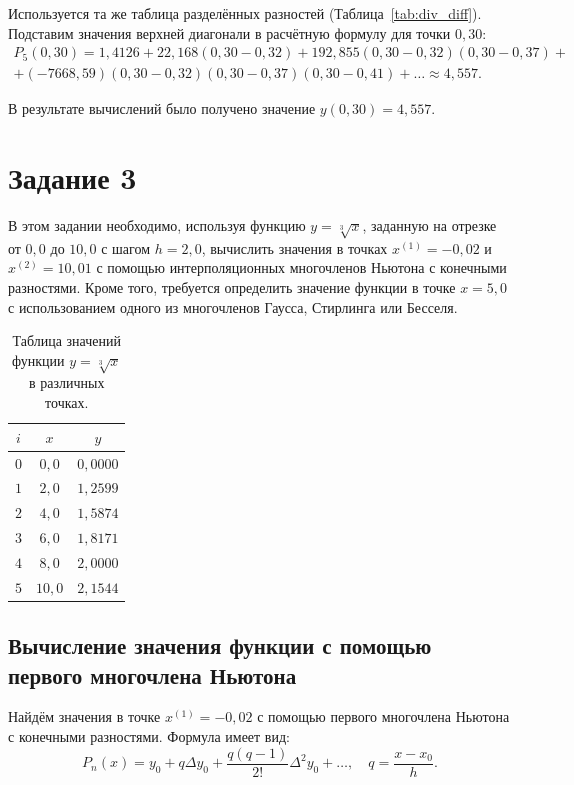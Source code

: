 \documentclass[a4paper, final]{article}
\begin{document}
Используется та же таблица разделённых разностей (Таблица~\ref{tab:div_diff}). Подставим значения верхней диагонали в расчётную формулу для точки $0{,}30$:
\begin{multline*}
P_5(0{,}30) = 1{,}4126 + 22{,}168(0{,}30 - 0{,}32) + 192{,}855(0{,}30 - 0{,}32)(0{,}30 - 0{,}37) + \\
+ (-7668{,}59)(0{,}30 - 0{,}32)(0{,}30 - 0{,}37)(0{,}30 - 0{,}41) + \dots \approx 4{,}557.
\end{multline*}

В результате вычислений было получено значение \(y(0{,}30) = 4{,}557\).

\newpage

\section{Задание 3}

В этом задании необходимо, используя функцию \(y = \sqrt[3]{x}\), заданную на отрезке от \(0{,}0\) до \(10{,}0\) с шагом \(h = 2{,}0\), вычислить значения в точках \(x^{(1)} = -0{,}02\) и \(x^{(2)} = 10{,}01\) с помощью интерполяционных многочленов Ньютона с конечными разностями. Кроме того, требуется определить значение функции в точке \(x = 5{,}0\) с использованием одного из многочленов Гаусса, Стирлинга или Бесселя.

\begin{table}[h!]
\centering
\begin{tabular}{|c|c|c|}
\hline
$i$ & $x$ & $y$ \\
\hline
$0$ & $0{,}0$ & $0{,}0000$ \\
$1$ & $2{,}0$ & $1{,}2599$ \\
$2$ & $4{,}0$ & $1{,}5874$ \\
$3$ & $6{,}0$ & $1{,}8171$ \\
$4$ & $8{,}0$ & $2{,}0000$ \\
$5$ & $10{,}0$ & $2{,}1544$ \\
\hline
\end{tabular}
\caption{Таблица значений функции $y = \sqrt[3]{x}$ в различных точках.}
\label{tab:task3}
\end{table}

\subsection{Вычисление значения функции с помощью первого многочлена Ньютона}

Найдём значения в точке $x^{(1)} = -0{,}02$ с помощью первого многочлена Ньютона с конечными разностями. 
Формула имеет вид:
\[
P_n(x) = y_0 + q \Delta y_0 + \frac{q(q-1)}{2!} \Delta^2 y_0 + \dots, \quad q = \frac{x - x_0}{h}.
\]
\end{document}
